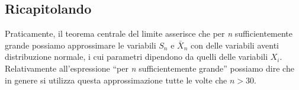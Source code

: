 \subsection{Ricapitolando}
Praticamente, il teorema centrale del limite asserisce che per \textit{n} sufficientemente grande possiamo approssimare le variabili $S_n$ e $\bar{X}_n$ con delle variabili aventi distribuzione normale, i cui parametri dipendono da quelli delle variabili $X_i$. \\
Relativamente all'espressione “per \textit{n} sufficientemente grande” possiamo dire che in
genere si utilizza questa approssimazione tutte le volte che $n > 30$.